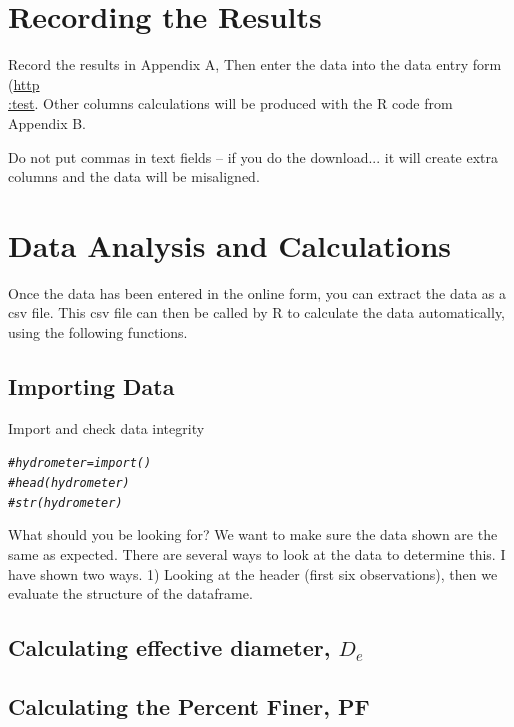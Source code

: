 \documentclass[12pt]{../SOP4_alpha}\usepackage[]{graphicx}\usepackage[]{xcolor}
\makeatletter
\newcommand{\hlcom}[1]{\textcolor[rgb]{0.678,0.584,0.686}{\textit{#1}}}%
\newenvironment{kframe}{%
 \def\at@end@of@kframe{}%
 \ifinner\ifhmode%
  \def\at@end@of@kframe{\end{minipage}}%
  \begin{minipage}{\columnwidth}%
 \fi\fi%
 \def\FrameCommand##1{\hskip\@totalleftmargin \hskip-\fboxsep
 \colorbox{shadecolor}{##1}\hskip-\fboxsep
     \hskip-\linewidth \hskip-\@totalleftmargin \hskip\columnwidth}%
 \MakeFramed {\advance\hsize-\width
   \@totalleftmargin\z@ \linewidth\hsize
   \@setminipage}}%
 {\par\unskip\endMakeFramed%
 \at@end@of@kframe}
\newenvironment{knitrout}{}{} %
\makeatother
\begin{document}
\section{Recording the Results}

Record the results in Appendix A, Then enter the data into the data entry form (\href{test}{http\\:test}. Other columns calculations will be produced with the R code from Appendix B.  

Do not put commas in text fields -- if you do the download... it will create extra columns and the data will be misaligned.

\section{Data Analysis and Calculations}

Once the data has been entered in the online form, you can extract the data as a csv file. This csv file can then be called by R to calculate the data automatically, using the following functions. 

\subsection*{Importing Data}

Import and check data integrity

\begin{knitrout}
\color{fgcolor}\begin{kframe}
\begin{alltt}
\hlcom{#hydrometer = import()}
\hlcom{#head(hydrometer)}
\hlcom{#str(hydrometer)}
\end{alltt}
\end{kframe}
\end{knitrout}

What should you be looking for?  We want to make sure the data shown are the same as expected. There are several ways to look at the data to determine this. I have shown two ways. 1) Looking at the header (first six observations), then we evaluate the structure of the dataframe.
 
\subsection{Calculating effective diameter, $D_e$}


\subsection{Calculating the Percent Finer, PF}
\end{document}
